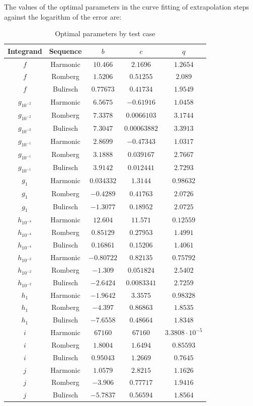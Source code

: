 The values of the optimal parameters in the curve fitting of extrapolation steps against the logarithm of the error are:

\begin{table}[H]
    \centering
    \begin{tabular}{c|c||c|c|c}
        Integrand & Sequence & \(b\) & \(c\) & \(q\) \\\hline\hline
$f$ & Harmonic & \(10.466\) & \(2.1696\) & \(1.2654\) \\
$f$ & Romberg & \(1.5206\) & \(0.51255\) & \(2.089\) \\
$f$ & Bulirsch & \(0.77673\) & \(0.41734\) & \(1.9549\) \\
$g_{10^{-2}}$ & Harmonic & \(6.5675\) & \(-0.61916\) & \(1.0458\) \\
$g_{10^{-2}}$ & Romberg & \(7.3378\) & \(0.0066103\) & \(3.1744\) \\
$g_{10^{-2}}$ & Bulirsch & \(7.3047\) & \(0.00063882\) & \(3.3913\) \\
$g_{10^{-1}}$ & Harmonic & \(2.8699\) & \(-0.47343\) & \(1.0317\) \\
$g_{10^{-1}}$ & Romberg & \(3.1888\) & \(0.039167\) & \(2.7667\) \\
$g_{10^{-1}}$ & Bulirsch & \(3.9142\) & \(0.012441\) & \(2.7293\) \\
$g_1$ & Harmonic & \(0.034332\) & \(1.3144\) & \(0.98632\) \\
$g_1$ & Romberg & \(-0.4289\) & \(0.41763\) & \(2.0726\) \\
$g_1$ & Bulirsch & \(-1.3077\) & \(0.18952\) & \(2.0725\) \\
$h_{10^{-4}}$ & Harmonic & \(12.604\) & \(11.571\) & \(0.12559\) \\
$h_{10^{-4}}$ & Romberg & \(0.85129\) & \(0.27953\) & \(1.4991\) \\
$h_{10^{-4}}$ & Bulirsch & \(0.16861\) & \(0.15206\) & \(1.4061\) \\
$h_{10^{-2}}$ & Harmonic & \(-0.80722\) & \(0.82135\) & \(0.75792\) \\
$h_{10^{-2}}$ & Romberg & \(-1.309\) & \(0.051824\) & \(2.5402\) \\
$h_{10^{-2}}$ & Bulirsch & \(-2.6424\) & \(0.0083341\) & \(2.7259\) \\
$h_1$ & Harmonic & \(-1.9642\) & \(3.3575\) & \(0.98328\) \\
$h_1$ & Romberg & \(-4.397\) & \(0.86863\) & \(1.8535\) \\
$h_1$ & Bulirsch & \(-7.6558\) & \(0.48664\) & \(1.8348\) \\
$i$ & Harmonic & \(67160\) & \(67160\) & \(3.3808\cdot 10^{-5}\) \\
$i$ & Romberg & \(1.8004\) & \(1.6494\) & \(0.85593\) \\
$i$ & Bulirsch & \(0.95043\) & \(1.2669\) & \(0.7645\) \\
$j$ & Harmonic & \(1.0579\) & \(2.8215\) & \(1.1626\) \\
$j$ & Romberg & \(-3.906\) & \(0.77717\) & \(1.9416\) \\
$j$ & Bulirsch & \(-5.7837\) & \(0.56594\) & \(1.8564\)
    \end{tabular}
    \caption{Optimal parameters by test case}
    \label{tab:my_label}
\end{table}